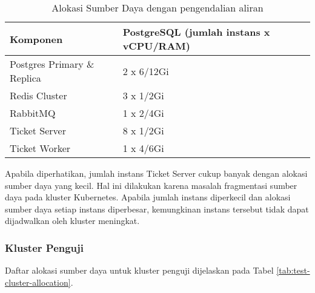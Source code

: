 \pagebreak

\begin{table}[htbp]
    \centering
    \caption{Alokasi Sumber Daya dengan pengendalian aliran}
    \label{tab:service_comparison_fc}
    \begin{tabular}{|l|l|}
        \hline
        \textbf{Komponen}           & \textbf{PostgreSQL (jumlah instans x vCPU/RAM)} \\ \hline
        Postgres Primary \& Replica & 2 x 6/12Gi                                      \\ \hline
        Redis Cluster               & 3 x 1/2Gi                                       \\ \hline
        RabbitMQ                    & 1 x 2/4Gi                                       \\ \hline
        Ticket Server               & 8 x 1/2Gi                                       \\ \hline
        Ticket Worker               & 1 x 4/6Gi                                       \\ \hline
    \end{tabular}
\end{table}

Apabila diperhatikan, jumlah instans Ticket Server cukup banyak dengan alokasi sumber daya yang kecil. Hal ini dilakukan karena masalah fragmentasi sumber daya pada kluster Kubernetes. Apabila jumlah instans diperkecil dan alokasi sumber daya setiap instans diperbesar, kemungkinan instans tersebut tidak dapat dijadwalkan oleh kluster meningkat.

\subsubsection{Kluster Penguji}

Daftar alokasi sumber daya untuk kluster penguji dijelaskan pada Tabel \ref{tab:test-cluster-allocation}.

